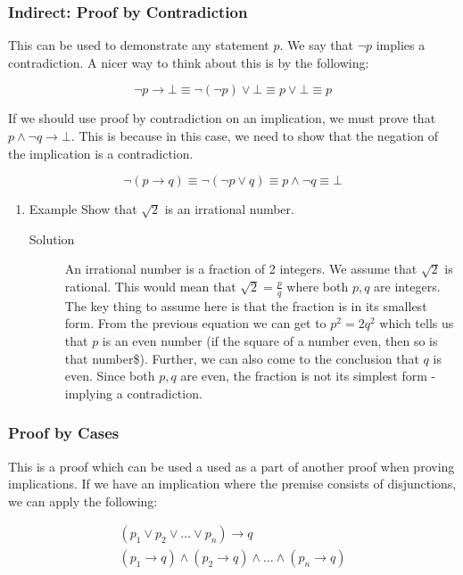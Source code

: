 \documentclass[11pt]{article}
\begin{document}
\subsubsection{Indirect: Proof by Contradiction}
\label{sec:org1a78359}
This can be used to demonstrate any statement \(p\). We say that \(\neg p\) implies a contradiction. A nicer way to think about this is by the following:

\[
\neg p \to \bot \equiv \neg (\neg p) \lor \bot \equiv p \lor \bot \equiv p
\]

If we should use proof by contradiction on an implication, we must prove that \(p \land \neg q \to \bot\). This is because in this case, we need to show that the negation of the implication is a contradiction.

\[
\neg (p \to q) \equiv \neg (\neg p \lor q) \equiv p \land \neg q \equiv \bot
\]

\begin{enumerate}
\item Example
\label{sec:org275eb51}
Show that \(\sqrt{2}\) is an irrational number.

\begin{description}
\item[{Solution}] An irrational number is a fraction of 2 integers. We assume that \(\sqrt{2}\) is rational. This would mean that \(\sqrt{2} = \frac{p}{q}\) where both \(p,q\) are integers. The key thing to assume here is that the fraction is in its smallest form. From the previous equation we can get to \(p^2 = 2q^2\) which tells us that \(p\) is an even number (if the square of a number even, then so is that number\$). Further, we can also come to the conclusion that \(q\) is even. Since both \(p,q\) are even, the fraction is not its simplest form - implying a contradiction.
\end{description}
\end{enumerate}
\subsubsection{Proof by Cases}
\label{sec:org0c126ed}
This is a proof which can be used a used as a part of another proof when proving implications. If we have an implication where the premise consists of disjunctions, we can apply the following:

\begin{align}
(p_1 \lor p_2 \lor \ldots \lor p_n) \to q \\
(p_1 \to q) \land (p_2 \to q) \land \ldots \land (p_n \to q)
\end{align}
\end{document}
